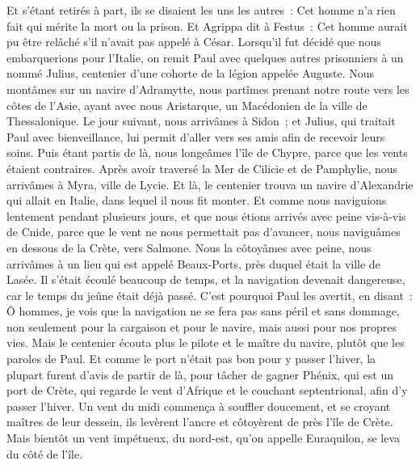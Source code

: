 \begin{multicols}{2}
Et s'étant retirés à part, ils se disaient les uns les autres~: Cet homme n'a rien fait qui mérite la mort ou la prison.
Et Agrippa dit à Festus~: Cet homme aurait pu être relâché s'il n'avait pas appelé à César.
\VerseOne{}Lorsqu'il fut décidé que nous embarquerions pour l'Italie, on remit Paul avec quelques autres prisonniers à un nommé Julius, centenier d'une cohorte de la légion appelée Auguste.
Nous montâmes sur un navire d'Adramytte, nous partîmes prenant notre route vers les côtes de l'Asie, ayant avec nous Aristarque, un Macédonien de la ville de Thessalonique.
Le jour suivant, nous arrivâmes à Sidon~; et Julius, qui traitait Paul avec bienveillance, lui permit d'aller vers ses amis afin de recevoir leurs soins.
Puis étant partis de là, nous longeâmes l'île de Chypre, parce que les vents étaient contraires.
Après avoir traversé la Mer de Cilicie et de Pamphylie, nous arrivâmes à Myra, ville de Lycie.
Et là, le centenier trouva un navire d'Alexandrie qui allait en Italie, dans lequel il nous fit monter.
Et comme nous naviguions lentement pendant plusieurs jours, et que nous étions arrivés avec peine vis-à-vis de Cnide, parce que le vent ne nous permettait pas d'avancer, nous naviguâmes en dessous de la Crète, vers Salmone.
Nous la côtoyâmes avec peine, nous arrivâmes à un lieu qui est appelé Beaux-Ports, près duquel était la ville de Lasée.
Il s'était écoulé beaucoup de temps, et la navigation devenait dangereuse, car le temps du jeûne était déjà passé.
C'est pourquoi Paul les avertit, en disant~: Ô hommes, je vois que la navigation ne se fera pas sans péril et sans dommage, non seulement pour la cargaison et pour le navire, mais aussi pour nos propres vies.
Mais le centenier écouta plus le pilote et le maître du navire, plutôt que les paroles de Paul.
Et comme le port n'était pas bon pour y passer l'hiver, la plupart furent d'avis de partir de là, pour tâcher de gagner Phénix, qui est un port de Crète, qui regarde le vent d'Afrique et le couchant septentrional, afin d'y passer l'hiver.
Un vent du midi commença à souffler doucement, et se croyant maîtres de leur dessein, ils levèrent l'ancre et côtoyèrent de près l'île de Crète.
Mais bientôt un vent impétueux, du nord-est, qu'on appelle Euraquilon, se leva du côté de l'île.

\end{multicols}
